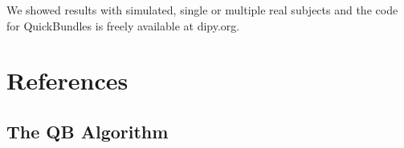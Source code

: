 \documentclass[preprint,authoryear,a4paper,10pt,onecolumn]{elsarticle}
\begin{document}
We showed results with simulated, single or multiple real subjects
and the code for QuickBundles is freely available at dipy.org.

\section{References}

%



\begin{appendices}

\section{The QB Algorithm\label{Sec:QB-Algorithm}}



\end{appendices}
\end{document}
